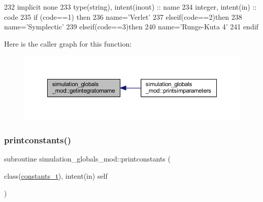 \begin{DoxyCode}
232     \textcolor{keywordtype}{implicit none}
233     \textcolor{keywordtype}{type}(string), \textcolor{keywordtype}{intent(inout)} :: name
234     \textcolor{keywordtype}{integer}, \textcolor{keywordtype}{intent(in)} :: code
235     \textcolor{keywordflow}{if} (code==1) \textcolor{keywordflow}{then}
236         name=\textcolor{stringliteral}{'Verlet'}
237     \textcolor{keywordflow}{elseif}(code==2)\textcolor{keywordflow}{then}
238         name=\textcolor{stringliteral}{'Symplectic'}
239     \textcolor{keywordflow}{elseif}(code==3)\textcolor{keywordflow}{then}
240         name=\textcolor{stringliteral}{'Runge-Kuta 4'}
241 \textcolor{keywordflow}{    endif}
\end{DoxyCode}
Here is the caller graph for this function\+:\nopagebreak
\begin{figure}[H]
\begin{center}
\leavevmode
\includegraphics[width=350pt]{namespacesimulation__globals__mod_a68e871ed8e5d3930884e968c6fdafddc_icgraph}
\end{center}
\end{figure}
\mbox{\label{namespacesimulation__globals__mod_a20ba28d72a9bea823d9373a94f97026e}} 
\subsubsection{\texorpdfstring{printconstants()}{printconstants()}}
{\footnotesize\ttfamily subroutine simulation\+\_\+globals\+\_\+mod\+::printconstants (\begin{DoxyParamCaption}\item[{class(\mbox{\hyperlink{structsimulation__globals__mod_1_1constants__t}{constants\+\_\+t}}), intent(in)}]{self }\end{DoxyParamCaption})\hspace{0.3cm}{\ttfamily [private]}}



